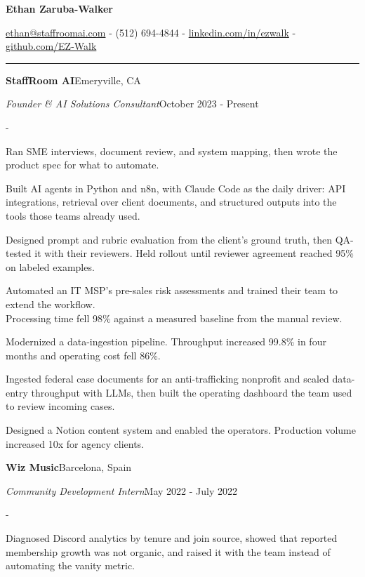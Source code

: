 \documentclass[10pt,letterpaper]{article}
\newenvironment{cvitems}{%
  \begin{list}{-}{%
    \setlength{\leftmargin}{12pt}%
    \setlength{\itemsep}{1.2pt}%
    \setlength{\parsep}{0pt}%
    \setlength{\topsep}{1.5pt}%
    \setlength{\partopsep}{0pt}%
    \setlength{\labelwidth}{6pt}%
    \setlength{\labelsep}{6pt}%
    \setlength{\itemindent}{0pt}%
  }%
}{\end{list}}
\newcommand{\cvsection}[1]{%
  \vspace{7pt}%
  \noindent{\bfseries\fontsize{11pt}{13pt}\selectfont\MakeUppercase{#1}}\par
  \vspace{1pt}%
  \noindent\rule{\textwidth}{0.4pt}\par
  \vspace{4pt}%
}
\newcommand{\cventryhead}[4]{%
  \noindent\textbf{#1}\hfill#2\par
  \vspace{0.5pt}%
  \noindent\textit{#3}\hfill#4\par
}
\begin{document}
\begin{center}
  {\bfseries\fontsize{22pt}{24pt}\selectfont Ethan Zaruba-Walker\par}
  \vspace{4pt}
  {\fontsize{10pt}{12pt}\selectfont
    \href{mailto:ethan@staffroomai.com}{ethan@staffroomai.com}
    {-}
    (512) 694-4844
    {-}
    \href{https://linkedin.com/in/ezwalk}{linkedin.com/in/ezwalk}
    {-}
    \href{https://github.com/EZ-Walk}{github.com/EZ-Walk}\par}
\end{center}
\vspace{2pt}

\cvsection{Experience}

\cventryhead{StaffRoom AI}{Emeryville, CA}
{Founder \& AI Solutions Consultant}{October 2023 - Present}
\begin{cvitems}
  \item Ran SME interviews, document review, and system mapping, then wrote the product spec for what to automate.
  \item Built AI agents in Python and n8n, with Claude Code as the daily driver: API integrations, retrieval over client documents, and structured outputs into the tools those teams already used.
  \item Designed prompt and rubric evaluation from the client's ground truth, then QA-tested it with their reviewers. Held rollout until reviewer agreement reached 95\% on labeled examples.
  \item Automated an IT MSP's pre-sales risk assessments and trained their team to extend the workflow.\\
  Processing time fell 98\% against a measured baseline from the manual review.
  \item Modernized a data-ingestion pipeline. Throughput increased 99.8\% in four months and operating cost fell 86\%.
  \item Ingested federal case documents for an anti-trafficking nonprofit and scaled data-entry throughput with LLMs, then built the operating dashboard the team used to review incoming cases.
  \item Designed a Notion content system and enabled the operators. Production volume increased 10x for agency clients.
\end{cvitems}

\vspace{3pt}
\cventryhead{Wiz Music}{Barcelona, Spain}
{Community Development Intern}{May 2022 - July 2022}
\begin{cvitems}
  \item Diagnosed Discord analytics by tenure and join source, showed that reported membership growth was not organic, and raised it with the team instead of automating the vanity metric.
\end{cvitems}
\end{document}
